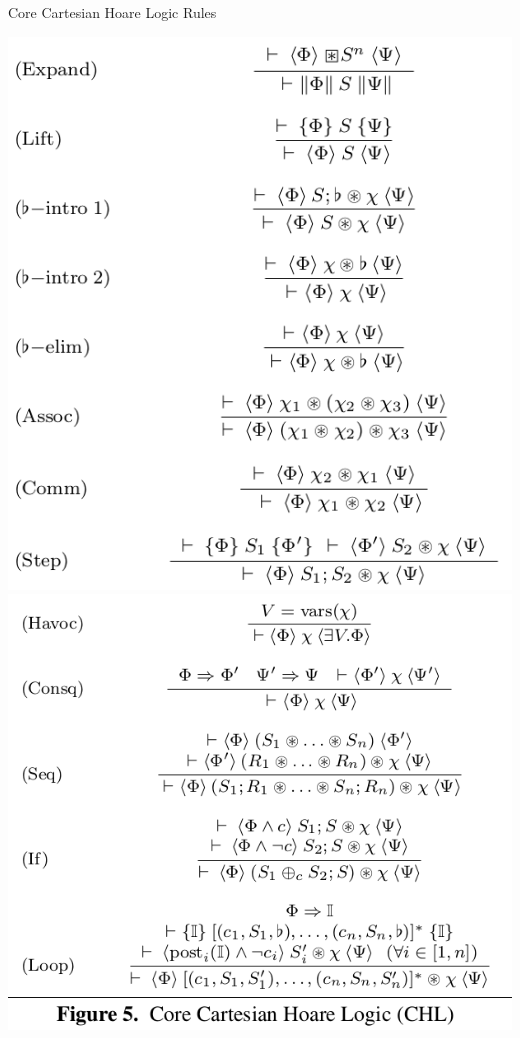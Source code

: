 \documentclass[page number]{beamer}
\begin{document}
\begin{frame}{Core Cartesian Hoare Logic Rules}
  \begin{center}
    \includegraphics[scale=0.28]{img_sousa/rules1.png}
    \includegraphics[scale=0.28]{img_sousa/rules2.png}
  \end{center}
\end{frame}
\end{document}
